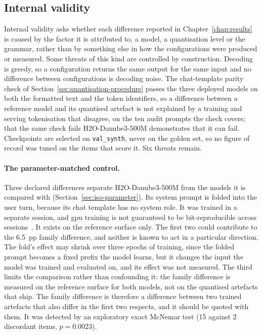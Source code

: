 \subsection{Internal validity}
\label{sec:threats-internal}

Internal validity asks whether each difference reported in Chapter~\ref{chap:results} is caused
by the factor it is attributed to, a model, a quantisation level or the grammar, rather than by
something else in how the configurations were produced or measured. Some threats of this kind are
controlled by construction. Decoding is greedy, so a configuration returns the same output for the
same input and no difference between configurations is decoding noise. The chat-template parity
check of Section~\ref{sec:quantisation-procedure} passes the three deployed models on both the formatted text and the token identifiers, so a
difference between a reference model and its quantised artefact is not explained by a training and
serving tokenisation that disagree, on the ten audit prompts the check covers; that the same check fails H2O-Danube3-500M demonstrates that it can fail.
Checkpoints are selected on \texttt{val\_synth}, never on the golden set, so no figure of record was
tuned on the items that score it. Six threats remain.

\paragraph{The parameter-matched control.} Three declared differences separate H2O-Danube3-500M
from the models it is compared with (Section~\ref{sec:iso-parameter}). Its system prompt is folded
into the user turn, because its chat template has no system role. It was trained in a separate
session, and \gls{gpu} training is not guaranteed to be bit-reproducible across
sessions~\cite{pytorchrepro}. It exists
on the reference surface only. The first two could contribute to the 6.5~pp family difference, and
neither is known to act in a particular direction. The fold's effect may shrink over three epochs of
training, since the folded prompt becomes a fixed prefix the model learns, but it changes the input
the model was trained and evaluated on, and its effect was not measured. The third limits the
comparison rather than confounding it: the family difference is measured on the reference surface
for both models, not on the quantised artefacts that ship. The family difference is therefore a difference between two trained artefacts that
also differ in the first two respects, and it should be quoted with them. It was detected by an
exploratory exact McNemar test (15 against 2 discordant items, $p = 0.0023$).

